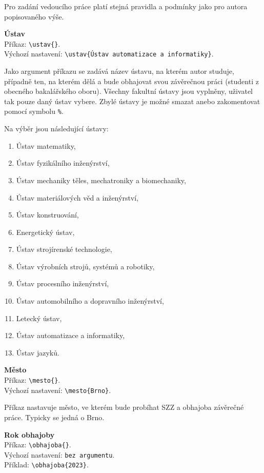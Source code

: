 Pro zadání vedoucího práce platí stejná pravidla a podmínky jako pro autora popisovaného výše.

\vspace{8pt}
\textbf{Ústav}\\
Příkaz: \verb|\ustav{}|.\\
Výchozí nastavení: \verb|\ustav{Ústav automatizace a informatiky}|.

Jako argument příkazu se zadává název ústavu, na kterém autor studuje, případně ten, na kterém dělá a bude obhajovat svou závěrečnou práci (studenti z obecného bakalářského oboru). Všechny fakultní ústavy jsou vyplněny, uživatel tak pouze daný ústav vybere. Zbylé ústavy je možné smazat anebo zakomentovat pomocí symbolu \verb|%|.

Na výběr jsou následující ústavy:

\begin{enumerate}
	\item Ústav matematiky,
	\item Ústav fyzikálního inženýrství,
	\item Ústav mechaniky těles, mechatroniky a biomechaniky,
	\item Ústav materiálových věd a inženýrství,
	\item Ústav konstruování,
	\item Energetický ústav,
	\item Ústav strojírenské technologie,
	\item Ústav výrobních strojů, systémů a robotiky,
	\item Ústav procesního inženýrství,
	\item Ústav automobilního a dopravního inženýrství,
	\item Letecký ústav,
	\item Ústav automatizace a informatiky,
	\item Ústav jazyků.
\end{enumerate}

\vspace{8pt}
\textbf{Město}\\
Příkaz: \verb|\mesto{}|.\\
Výchozí nastavení: \verb|\mesto{Brno}|.

Příkaz nastavuje město, ve kterém bude probíhat SZZ a obhajoba závěrečné práce. Typicky se jedná o Brno.

\vspace{8pt}
\textbf{Rok obhajoby}\\
Příkaz: \verb|\obhajoba{}|.\\
Výchozí nastavení: \verb|bez argumentu|.\\
Příklad: \verb|\obhajoba{2023}|.

